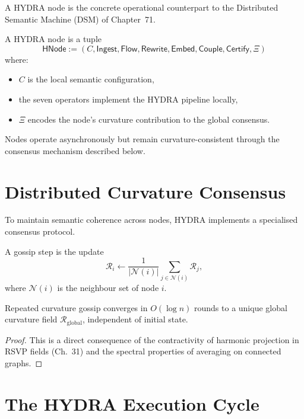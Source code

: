 A HYDRA node is the concrete operational counterpart to the 
Distributed Semantic Machine (DSM) of Chapter~71.

\begin{definition}
A HYDRA node is a tuple
\[
\mathsf{HNode} 
  := (C, \mathsf{Ingest}, \mathsf{Flow}, \mathsf{Rewrite}, 
      \mathsf{Embed}, \mathsf{Couple}, \mathsf{Certify}, \Xi)
\]
where:
\begin{itemize}
\item $C$ is the local semantic configuration,
\item the seven operators implement the HYDRA pipeline locally,
\item $\Xi$ encodes the node’s curvature contribution to the global consensus.
\end{itemize}
\end{definition}

Nodes operate asynchronously but remain curvature-consistent through the 
consensus mechanism described below.

\section{Distributed Curvature Consensus}

To maintain semantic coherence across nodes, HYDRA implements a specialised 
consensus protocol.

\begin{definition}
A gossip step is the update
\[
\mathcal{R}_i \gets 
\frac{1}{|\mathcal{N}(i)|}
 \sum_{j \in \mathcal{N}(i)} \mathcal{R}_j,
\]
where $\mathcal{N}(i)$ is the neighbour set of node $i$.
\end{definition}

\begin{theorem}
Repeated curvature gossip converges in $O(\log n)$ rounds to a unique global 
curvature field $\mathcal{R}_{\mathrm{global}}$, independent of initial state.
\end{theorem}

\begin{proof}
This is a direct consequence of the contractivity of harmonic projection in 
RSVP fields (Ch.~31) and the spectral properties of averaging on connected 
graphs.
\end{proof}

\section{The HYDRA Execution Cycle}

